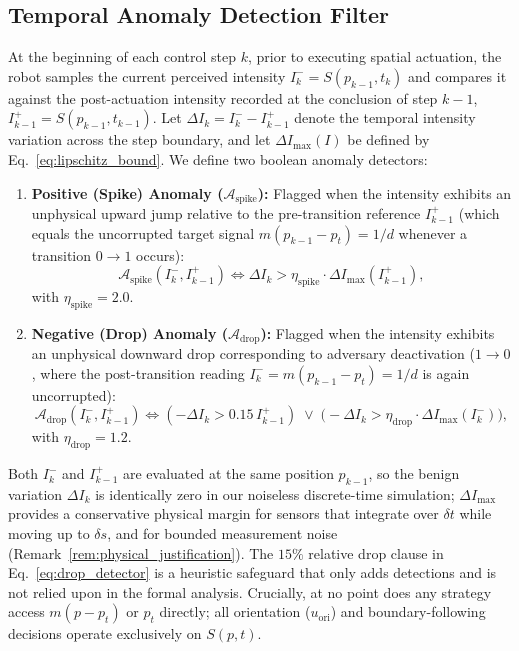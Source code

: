 \documentclass[12pt, a4paper]{article}
\begin{document}
\subsection{Temporal Anomaly Detection Filter}
At the beginning of each control step $k$, prior to executing spatial actuation, the robot samples the current perceived intensity $I_k^- = S(p_{k-1}, t_k)$ and compares it against the post-actuation intensity recorded at the conclusion of step $k-1$, $I_{k-1}^+ = S(p_{k-1}, t_{k-1})$. Let $\Delta I_k = I_k^- - I_{k-1}^+$ denote the temporal intensity variation across the step boundary, and let $\Delta I_{\max}(I)$ be defined by Eq.~\eqref{eq:lipschitz_bound}. We define two boolean anomaly detectors:
\begin{enumerate}
    \item \textbf{Positive (Spike) Anomaly ($\mathcal{A}_{\text{spike}}$):} Flagged when the intensity exhibits an unphysical upward jump relative to the pre-transition reference $I_{k-1}^+$ (which equals the uncorrupted target signal $m(p_{k-1}-p_t) = 1/d$ whenever a transition $0 \to 1$ occurs):
    \begin{equation}
        \mathcal{A}_{\text{spike}}(I_k^-, I_{k-1}^+) \iff \Delta I_k > \eta_{\text{spike}} \cdot \Delta I_{\max}(I_{k-1}^+),
        \label{eq:spike_detector}
    \end{equation}
    with $\eta_{\text{spike}} = 2.0$.
    \item \textbf{Negative (Drop) Anomaly ($\mathcal{A}_{\text{drop}}$):} Flagged when the intensity exhibits an unphysical downward drop corresponding to adversary deactivation ($1 \to 0$, where the post-transition reading $I_k^- = m(p_{k-1}-p_t) = 1/d$ is again uncorrupted):
    \begin{equation}
        \mathcal{A}_{\text{drop}}(I_k^-, I_{k-1}^+) \iff (-\Delta I_k > 0.15\, I_{k-1}^+) \;\lor\; \bigl(-\Delta I_k > \eta_{\text{drop}} \cdot \Delta I_{\max}(I_k^-)\bigr),
        \label{eq:drop_detector}
    \end{equation}
    with $\eta_{\text{drop}} = 1.2$.
\end{enumerate}

Both $I_k^-$ and $I_{k-1}^+$ are evaluated at the same position $p_{k-1}$, so the benign variation $\Delta I_k$ is identically zero in our noiseless discrete-time simulation; $\Delta I_{\max}$ provides a conservative physical margin for sensors that integrate over $\delta t$ while moving up to $\delta s$, and for bounded measurement noise (Remark~\ref{rem:physical_justification}). The $15\%$ relative drop clause in Eq.~\eqref{eq:drop_detector} is a heuristic safeguard that only adds detections and is not relied upon in the formal analysis. Crucially, at no point does any strategy access $m(p - p_t)$ or $p_t$ directly; all orientation ($u_{\text{ori}}$) and boundary-following decisions operate exclusively on $S(p, t)$.
\end{document}
